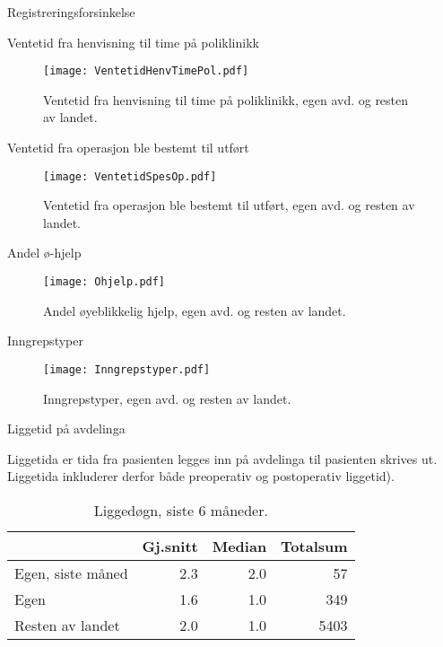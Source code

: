 \documentclass[handout, xcolor=pdftex,dvipsnames,table]{beamer}  %
\begin{document}
\begin{tiny}
\begin{frame}[fragile] {Registreringsforsinkelse}
\end{frame}




\begin{frame}[fragile] {Ventetid fra henvisning til time på poliklinikk}
\begin{figure}[ht]
\centering
\texttt{[image: VentetidHenvTimePol.pdf]}
\caption{Ventetid fra henvisning til time på poliklinikk, egen avd. og resten av landet.}
\end{figure}
\end{frame}

\begin{frame}[fragile] {Ventetid fra operasjon ble bestemt til utført}
\begin{figure}[ht]
\centering
\texttt{[image: VentetidSpesOp.pdf]}
\caption{Ventetid fra operasjon ble bestemt til utført, egen avd. og resten av landet.}
\end{figure}
\end{frame}

\begin{frame}[fragile] {Andel ø-hjelp}
\begin{figure}[ht]
\centering
\texttt{[image: Ohjelp.pdf]}
\caption{Andel øyeblikkelig hjelp, egen avd. og resten av landet.}
\end{figure}
\end{frame}

\begin{frame}[fragile] {Inngrepstyper}
\begin{figure}[ht]
\centering
\texttt{[image: Inngrepstyper.pdf]}
\caption{Inngrepstyper, egen avd. og resten av landet.}
\end{figure}
\end{frame}



\begin{frame}[fragile] {Liggetid på avdelinga}

Liggetida er tida fra pasienten legges inn på avdelinga til pasienten skrives ut.
Liggetida inkluderer derfor både preoperativ og postoperativ liggetid).

\begin{table}[ht]
\centering
\begin{tabular}{lrrr}
  \hline
 & Gj.snitt & Median & Totalsum \\ 
  \hline
Egen, siste måned & 2.3 & 2.0 & 57 \\ 
  Egen & 1.6 & 1.0 & 349 \\ 
  Resten av landet & 2.0 & 1.0 & 5403 \\ 
   \hline
\end{tabular}
\caption{Liggedøgn, siste 6 måneder.} 
\label{tab:liggetidKj}
\end{table}



\end{frame}
\end{tiny}
\end{document}
